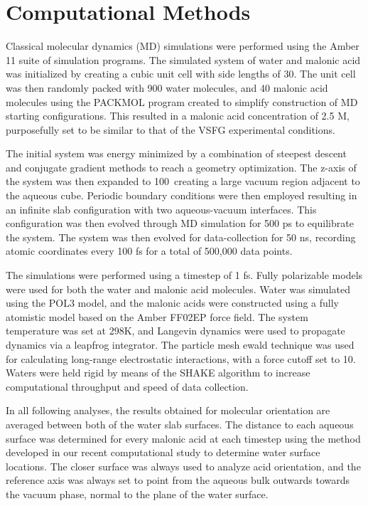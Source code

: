 \section {Computational Methods}

Classical molecular dynamics (MD) simulations were performed using the Amber 11 suite of simulation programs.\cite{Case2010,Pearlman1995} The simulated system of water and malonic acid was initialized by creating a cubic unit cell with side lengths of 30\angs. The unit cell was then randomly packed with 900 water molecules, and 40 malonic acid molecules using the PACKMOL program created to simplify construction of MD starting configurations.\cite{Martinez2009} This resulted in a malonic acid concentration of 2.5 M, purposefully set to be similar to that of the VSFG experimental conditions.

The initial system was energy minimized by a combination of steepest descent and conjugate gradient methods to reach a geometry optimization. The z-axis of the system was then expanded to 100\angs~creating a large vacuum region adjacent to the aqueous cube. Periodic boundary conditions were then employed resulting in an infinite slab configuration with two aqueous-vacuum interfaces. This configuration was then evolved through MD simulation for 500 ps to equilibrate the system. The system was then evolved for data-collection for 50 ns, recording atomic coordinates every 100 fs for a total of 500,000 data points.

The simulations were performed using a timestep of 1 fs. Fully polarizable models were used for both the water and malonic acid molecules. Water was simulated using the POL3 model,\cite{Caldwell1995} and the malonic acids were constructed using a fully atomistic model based on the Amber FF02EP force field.\cite{Case2005} The system temperature was set at 298K, and Langevin dynamics were used to propagate dynamics via a leapfrog integrator. The particle mesh ewald technique was used for calculating long-range electrostatic interactions, with a force cutoff set to 10\angs. Waters were held rigid by means of the SHAKE algorithm to increase computational throughput and speed of data collection.

In all following analyses, the results obtained for molecular orientation are averaged between both of the water slab surfaces. The distance to each aqueous surface was determined for every malonic acid at each timestep using the method developed in our recent computational study to determine water surface locations.\cite{Shamay2011} The closer surface was always used to analyze acid orientation, and the reference axis was always set to point from the aqueous bulk outwards towards the vacuum phase, normal to the plane of the water surface.

